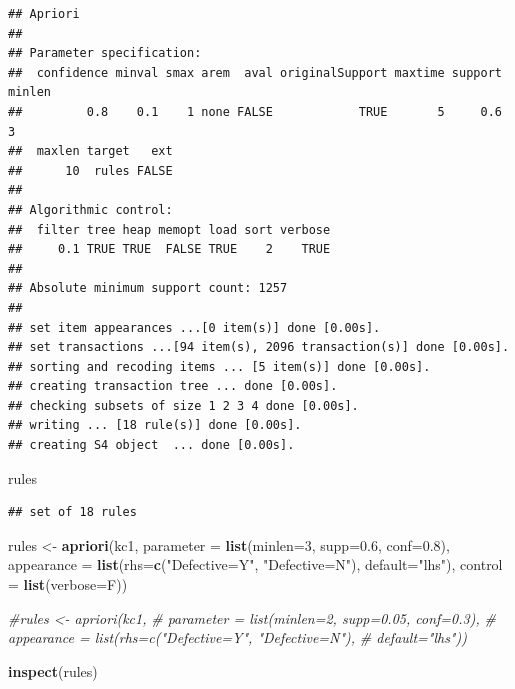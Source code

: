 \documentclass[]{book}
\newenvironment{Shaded}{\begin{snugshade}}{\end{snugshade}}
\newcommand{\KeywordTok}[1]{\textcolor[rgb]{0.13,0.29,0.53}{\textbf{{#1}}}}
\newcommand{\DataTypeTok}[1]{\textcolor[rgb]{0.13,0.29,0.53}{{#1}}}
\newcommand{\DecValTok}[1]{\textcolor[rgb]{0.00,0.00,0.81}{{#1}}}
\newcommand{\FloatTok}[1]{\textcolor[rgb]{0.00,0.00,0.81}{{#1}}}
\newcommand{\StringTok}[1]{\textcolor[rgb]{0.31,0.60,0.02}{{#1}}}
\newcommand{\CommentTok}[1]{\textcolor[rgb]{0.56,0.35,0.01}{\textit{{#1}}}}
\newcommand{\NormalTok}[1]{{#1}}
\begin{document}
\begin{verbatim}
## Apriori
## 
## Parameter specification:
##  confidence minval smax arem  aval originalSupport maxtime support minlen
##         0.8    0.1    1 none FALSE            TRUE       5     0.6      3
##  maxlen target   ext
##      10  rules FALSE
## 
## Algorithmic control:
##  filter tree heap memopt load sort verbose
##     0.1 TRUE TRUE  FALSE TRUE    2    TRUE
## 
## Absolute minimum support count: 1257 
## 
## set item appearances ...[0 item(s)] done [0.00s].
## set transactions ...[94 item(s), 2096 transaction(s)] done [0.00s].
## sorting and recoding items ... [5 item(s)] done [0.00s].
## creating transaction tree ... done [0.00s].
## checking subsets of size 1 2 3 4 done [0.00s].
## writing ... [18 rule(s)] done [0.00s].
## creating S4 object  ... done [0.00s].
\end{verbatim}

\begin{Shaded}
\begin{Highlighting}[]
\NormalTok{rules}
\end{Highlighting}
\end{Shaded}

\begin{verbatim}
## set of 18 rules
\end{verbatim}

\begin{Shaded}
\begin{Highlighting}[]
\NormalTok{rules <-}\StringTok{ }\KeywordTok{apriori}\NormalTok{(kc1,}
   \DataTypeTok{parameter =} \KeywordTok{list}\NormalTok{(}\DataTypeTok{minlen=}\DecValTok{3}\NormalTok{, }\DataTypeTok{supp=}\FloatTok{0.6}\NormalTok{, }\DataTypeTok{conf=}\FloatTok{0.8}\NormalTok{),}
   \DataTypeTok{appearance =} \KeywordTok{list}\NormalTok{(}\DataTypeTok{rhs=}\KeywordTok{c}\NormalTok{(}\StringTok{"Defective=Y"}\NormalTok{, }\StringTok{"Defective=N"}\NormalTok{),}
   \DataTypeTok{default=}\StringTok{"lhs"}\NormalTok{),}
   \DataTypeTok{control =} \KeywordTok{list}\NormalTok{(}\DataTypeTok{verbose=}\NormalTok{F))}
 
 \CommentTok{#rules <- apriori(kc1,}
 \CommentTok{#   parameter = list(minlen=2, supp=0.05, conf=0.3),}
 \CommentTok{#   appearance = list(rhs=c("Defective=Y", "Defective=N"),}
 \CommentTok{#   default="lhs"))}
  
 \KeywordTok{inspect}\NormalTok{(rules)}
\end{Highlighting}
\end{Shaded}
\end{document}
